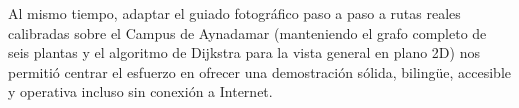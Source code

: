 \documentclass[11pt,a4paper]{article}
\begin{document}
Al mismo tiempo, adaptar el guiado fotográfico paso a paso a rutas reales calibradas sobre el Campus de Aynadamar (manteniendo el grafo completo de seis plantas y el algoritmo de Dijkstra para la vista general en plano 2D) nos permitió centrar el esfuerzo en ofrecer una demostración sólida, bilingüe, accesible y operativa incluso sin conexión a Internet.
\end{document}
